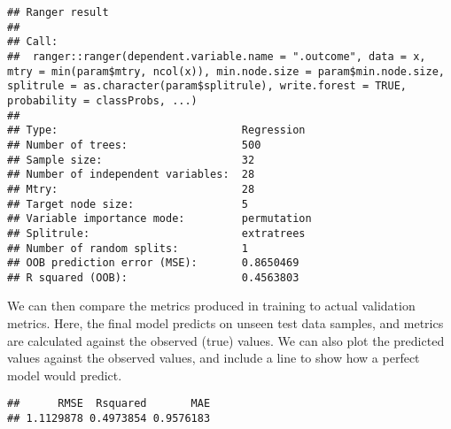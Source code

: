 \documentclass[
  oneside]{book}
\newenvironment{Shaded}{\begin{snugshade}}{\end{snugshade}}
\newcommand{\AttributeTok}[1]{\textcolor[rgb]{0.77,0.63,0.00}{#1}}
\newcommand{\FunctionTok}[1]{\textcolor[rgb]{0.00,0.00,0.00}{#1}}
\newcommand{\NormalTok}[1]{#1}
\newcommand{\OtherTok}[1]{\textcolor[rgb]{0.56,0.35,0.01}{#1}}
\newcommand{\SpecialCharTok}[1]{\textcolor[rgb]{0.00,0.00,0.00}{#1}}
\begin{document}
\begin{Shaded}
\end{Shaded}

\begin{verbatim}
## Ranger result
## 
## Call:
##  ranger::ranger(dependent.variable.name = ".outcome", data = x,      mtry = min(param$mtry, ncol(x)), min.node.size = param$min.node.size,      splitrule = as.character(param$splitrule), write.forest = TRUE,      probability = classProbs, ...) 
## 
## Type:                             Regression 
## Number of trees:                  500 
## Sample size:                      32 
## Number of independent variables:  28 
## Mtry:                             28 
## Target node size:                 5 
## Variable importance mode:         permutation 
## Splitrule:                        extratrees 
## Number of random splits:          1 
## OOB prediction error (MSE):       0.8650469 
## R squared (OOB):                  0.4563803
\end{verbatim}

We can then compare the metrics produced in training to actual validation metrics. Here,
the final model predicts on unseen test data samples, and metrics are calculated
against the observed (true) values. We can also plot the predicted values against the
observed values, and include a line to show how a perfect model would predict.

\begin{Shaded}
\end{Shaded}

\begin{verbatim}
##      RMSE  Rsquared       MAE 
## 1.1129878 0.4973854 0.9576183
\end{verbatim}
\end{document}
